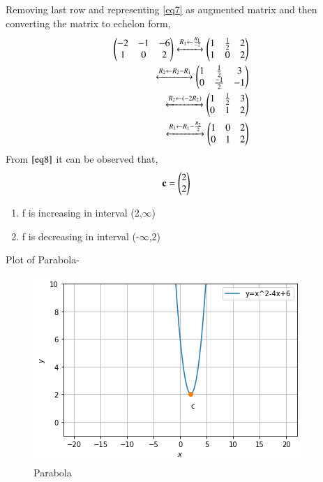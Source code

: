 \documentclass[journal,12pt,twocolumn]{IEEEtran}
\begin{document}
Removing last row and representing \eqref{eq7} as augmented matrix and then converting the matrix to echelon form,
\begin{align}
\begin{pmatrix}-2 & -1 & -6\\1 & 0 & 2\end{pmatrix} 
\xleftrightarrow{R_1\leftarrow \frac{R_1}{-2}}\begin{pmatrix}1 & \frac{1}{2} & 2\\1 & 0 & 2\end{pmatrix} 
\\
\xleftrightarrow{R_2\leftarrow R_2 -R_1}\begin{pmatrix}1 & \frac{1}{2} & 3 \\0 & \frac{-1}{2} & -1\end{pmatrix}
\\
\xleftrightarrow{R_2\leftarrow (-2R_2)}\begin{pmatrix}1 & \frac{1}{2} & 3 \\0 & 1 & 2\end{pmatrix}
\\
\xleftrightarrow{R_1\leftarrow R_1 - \frac{R_2}{2}}\begin{pmatrix}1 & 0 & 2\\0 & 1 & 2\end{pmatrix}   \label{eq8}
\end{align}
From $\eqref{eq8}$ it can be observed that,
\begin{align}
\mathbf{c} &= \begin{pmatrix}2 \\ 2\end{pmatrix}
\end{align}
\begin{enumerate}
\item f is increasing in interval (2,$\infty$)
\item f is decreasing in interval (-$\infty$,2)
\end{enumerate}

Plot of Parabola-
\begin{figure}[ht]
    \centering
    \includegraphics[width=\columnwidth]{Figure.png}
    \caption{Parabola}
    \label{fig:Prarabola}
\end{figure}    
\end{document}
